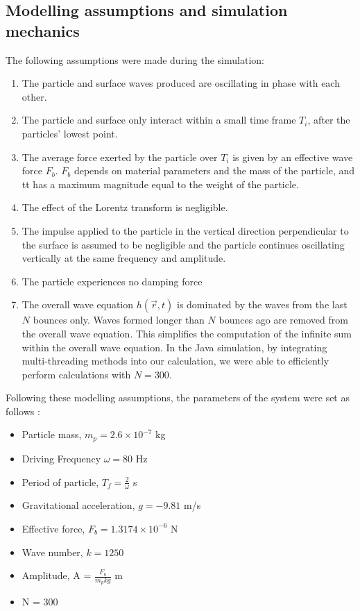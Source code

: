 \subsection{Modelling assumptions and simulation mechanics}

The following assumptions were made during the simulation: 

\begin{enumerate}
\item The particle and surface waves produced are oscillating in phase with each other.
\item The particle and surface only interact within a small time frame $T_i$, after the particles' lowest point.
\item The average force exerted by the particle over $T_i$ is given by an effective wave force $F_b$. $F_b$ depends on material parameters and the mass of the particle, and tt has a maximum magnitude equal to the weight of the particle.
\item The effect of the Lorentz transform is negligible.
\item The impulse applied to the particle in the vertical direction perpendicular to the surface is assumed to be negligible and the particle continues oscillating vertically at the same frequency and amplitude. 
\item The particle experiences no damping force
\item The overall wave equation $h(\vec{r} , t)$ is dominated by the waves from the last $N$ bounces only. Waves formed longer than $N$ bounces ago are removed from the overall wave equation. This simplifies the computation of the infinite sum within the overall wave equation. In the Java simulation, by integrating multi-threading methods into our calculation, we were able to efficiently perform calculations with $N = 300$.
\end{enumerate}

Following these modelling assumptions, the parameters of the system were set as follows \cite{dotwave}:

\begin{itemize}
\item Particle mass, $m_p = 2.6\times10^{-7}$ kg
\item Driving Frequency $\omega= 80$ Hz
\item Period of particle, $T_f = \frac{2}{\omega}$ s
\item Gravitational acceleration, $g = -9.81$ m/s
\item Effective force, $F_b = 1.3174\times10^{-6}$ N
\item Wave number, $k = 1250$
\item Amplitude, A = $\frac{F_b}{m_pkg}$ m
\item N = 300
\end{itemize}


